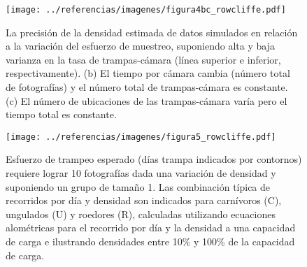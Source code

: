 \begin{frame}
\begin{figure}[h]
\centering
\texttt{[image: ../referencias/imagenes/figura4bc\_rowcliffe.pdf]}
\caption{
La precisi\'on de la densidad estimada de datos simulados en relaci\'on
a la variaci\'on del esfuerzo de muestreo, suponiendo alta y baja varianza en
la tasa de trampas-c\'amara (l\'inea superior e inferior, respectivamente).
(b) El tiempo por c\'amara cambia (n\'umero total de fotograf\'ias) y el
n\'umero total de trampas-c\'amara es constante. (c) El n\'umero de ubicaciones
de las trampas-c\'amara var\'ia pero el tiempo total es constante.}
\label{figura4b}
\end{figure}
\end{frame}
\begin{frame}
\begin{figure}[h]
\centering
\texttt{[image: ../referencias/imagenes/figura5\_rowcliffe.pdf]}
\caption{Esfuerzo de trampeo esperado (d\'ias trampa indicados por contornos)
requiere lograr 10 fotograf\'ias dada una variaci\'on de densidad y suponiendo
un grupo de tama\~no 1. Las combinaci\'on t\'ipica de recorridos por d\'ia y
densidad son indicados para carn\'ivoros (C), ungulados (U) y roedores (R),
calculadas utilizando ecuaciones alom\'etricas para el recorrido por d\'ia y la
densidad a una capacidad de carga e ilustrando densidades entre 10\% y 100\% de
la capacidad de carga. }
\label{figura5}
\end{figure}
\end{frame}
\begin{frame}
\end{frame}
